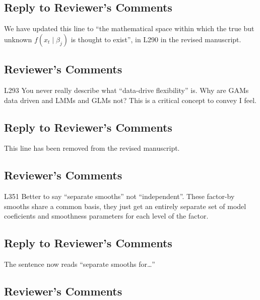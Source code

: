 \documentclass[
]{article}
\begin{document}
\hypertarget{section-19}{%
\subsection{\texorpdfstring{\textcolor{reviewersblue} {Reply to Reviewer's Comments}}{}}\label{section-19}}

We have updated this line to ``the mathematical space within which the true but unknown \(f(x_t\mid \beta_j)\) is thought to exist'', in L290 in the revised manuscript.

\hypertarget{reviewers-comments-20}{%
\subsection{Reviewer's Comments}\label{reviewers-comments-20}}

L293 You never really describe what ``data-drive flexibility'' is. Why are GAMs data driven and LMMs and GLMs not? This is a critical concept to convey I feel.

\hypertarget{section-20}{%
\subsection{\texorpdfstring{\textcolor{reviewersblue} {Reply to Reviewer's Comments}}{}}\label{section-20}}

This line has been removed from the revised manuscript.

\hypertarget{reviewers-comments-21}{%
\subsection{Reviewer's Comments}\label{reviewers-comments-21}}

L351 Better to say ``separate smooths'' not ``independent''. These factor-by smooths share a common basis, they just get an entirely separate set of model coeficients and smoothness parameters for each level of the factor.

\hypertarget{section-21}{%
\subsection{\texorpdfstring{\textcolor{reviewersblue} {Reply to Reviewer's Comments}}{}}\label{section-21}}

The sentence now reads ``separate smooths for\ldots{}''

\hypertarget{reviewers-comments-22}{%
\subsection{Reviewer's Comments}\label{reviewers-comments-22}}
\end{document}
